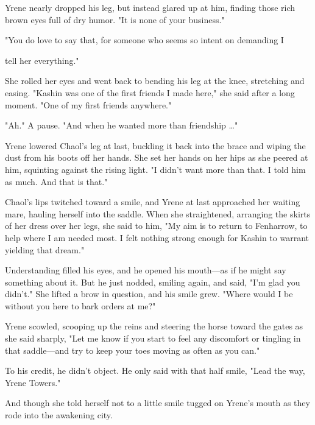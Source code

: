 Yrene nearly dropped his leg, but instead glared up at him, finding those rich brown eyes full of dry humor. "It is none of your business."

"You do love to say that, for someone who seems so intent on demanding I

tell her everything."

She rolled her eyes and went back to bending his leg at the knee, stretching and easing. "Kashin was one of the first friends I made here," she said after a long moment. "One of my first friends anywhere."

"Ah." A pause. "And when he wanted more than friendship \ldots"

Yrene lowered Chaol's leg at last, buckling it back into the brace and wiping the dust from his boots off her hands. She set her hands on her hips as she peered at him, squinting against the rising light. "I didn't want more than that. I told him as much. And that is that."

Chaol's lips twitched toward a smile, and Yrene at last approached her waiting mare, hauling herself into the saddle. When she straightened, arranging the skirts of her dress over her legs, she said to him, "My aim is to return to Fenharrow, to help where I am needed most. I felt nothing strong enough for Kashin to warrant yielding that dream."

Understanding filled his eyes, and he opened his mouth---as if he might say something about it. But he just nodded, smiling again, and said, "I'm glad you didn't." She lifted a brow in question, and his smile grew. "Where would I be without you here to bark orders at me?"

Yrene scowled, scooping up the reins and steering the horse toward the gates as she said sharply, "Let me know if you start to feel any discomfort or tingling in that saddle---and try to keep your toes moving as often as you can."

To his credit, he didn't object. He only said with that half smile, "Lead the way, Yrene Towers."

And though she told herself not to  a little smile tugged on Yrene's mouth as they rode into the awakening city.

